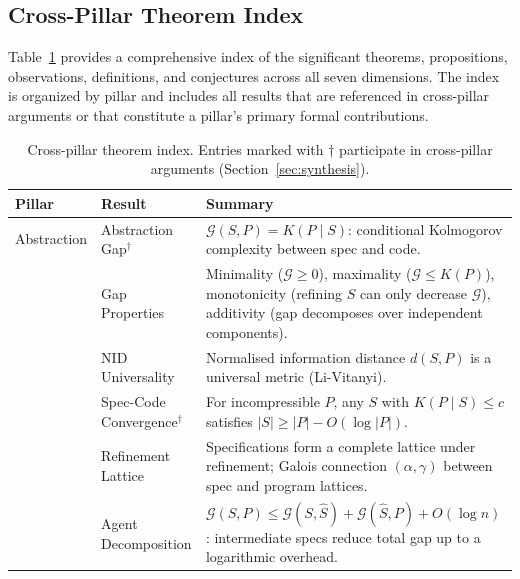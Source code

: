 \documentclass[11pt, a4paper]{googledeepmind}
\begin{document}
\begin{appendices}

\section{Cross-Pillar Theorem Index}
\label{app:theorems}

Table~\ref{tab:theorem-index} provides a comprehensive index of the significant theorems, propositions, observations, definitions, and conjectures across all seven dimensions. The index is organized by pillar and includes all results that are referenced in cross-pillar arguments or that constitute a pillar's primary formal contributions.

\scriptsize
\begin{longtable}{p{1.6cm}p{3.2cm}p{7.8cm}}
\caption{Cross-pillar theorem index. Entries marked with $\dagger$ participate in cross-pillar arguments (Section~\ref{sec:synthesis}).}
\label{tab:theorem-index} \\
\toprule
\textbf{Pillar} & \textbf{Result} & \textbf{Summary} \\
\midrule

Abstraction
    & Abstraction Gap$^\dagger$ & $\mathcal{G}(S,P) = K(P \mid S)$: conditional Kolmogorov complexity between spec and code. \\
    & Gap Properties & Minimality ($\mathcal{G} \geq 0$), maximality ($\mathcal{G} \leq K(P)$), monotonicity (refining $S$ can only decrease $\mathcal{G}$), additivity (gap decomposes over independent components). \\
    & NID Universality & Normalised information distance $d(S,P)$ is a universal metric (Li-Vitanyi). \\
    & Spec-Code Convergence$^\dagger$ & For incompressible $P$, any $S$ with $K(P \mid S) \leq c$ satisfies $|S| \geq |P| - O(\log |P|)$. \\
    & Refinement Lattice & Specifications form a complete lattice under refinement; Galois connection $(\alpha, \gamma)$ between spec and program lattices. \\
    & Agent Decomposition & $\mathcal{G}(S,P) \leq \mathcal{G}(S, \hat{S}) + \mathcal{G}(\hat{S}, P) + O(\log n)$: intermediate specs reduce total gap up to a logarithmic overhead. \\

\midrule


\end{longtable}
\end{appendices}
\end{document}
